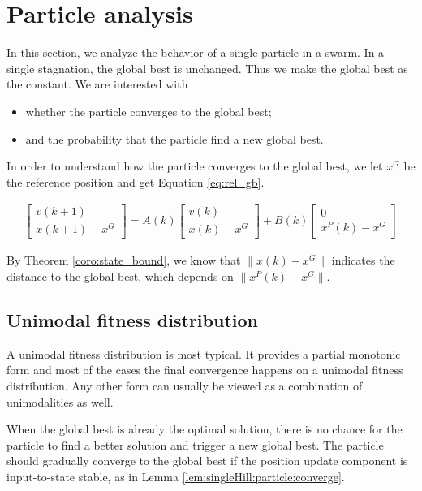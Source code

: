 \section{Particle analysis}
\label{sec:particle}

In this section, we analyze the behavior of a single particle in a swarm.
In a single stagnation, the global best is unchanged.
Thus we make the global best as the constant.
We are interested with 
\begin{itemize}
\item whether the particle converges to the global best;
\item and the probability that the particle find a new global best.
\end{itemize}

In order to understand how the particle converges to the global best, we let $ x^{G} $ be the reference position and get Equation \eqref{eq:rel_gb}.

\begin{equation}
\label{eq:rel_gb}
\begin{aligned}
\begin{bmatrix}
v(k+1) \\
x(k+1) - x^{G}
\end{bmatrix}
 = A(k) 
\begin{bmatrix}
v(k) \\
x(k) - x^{G}
\end{bmatrix}
+ B(k) 
\begin{bmatrix}
0 \\
x^{P}(k) - x^{G}
\end{bmatrix}
\end{aligned}
\end{equation}

By Theorem \ref{coro:state_bound}, we know that $ \lVert x(k) - x^{G} \rVert $ indicates the distance to the global best, which depends on  $ \lVert x^{P}(k) - x^{G} \rVert $.

\subsection{Unimodal fitness distribution}

A unimodal fitness distribution is most typical.
It provides a partial monotonic form and most of the cases the final convergence happens on a unimodal fitness distribution.
Any other form can usually be viewed as a combination of unimodalities as well.

When the global best is already the optimal solution, there is no chance for the particle to find a better solution and trigger a new global best.
The particle should gradually converge to the global best if the position update component is input-to-state stable, as in Lemma \ref{lem:singleHill:particle:converge}.

